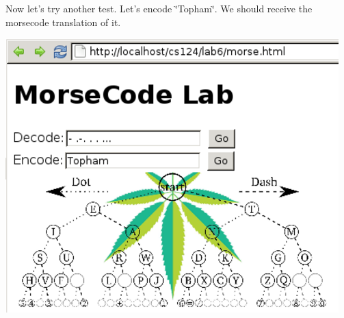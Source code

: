 Now let's try another test. Let's encode \char`\"{}\+Topham\char`\"{}. We should receive the morsecode translation of it.

 
    \includegraphics{../test61.png}
     